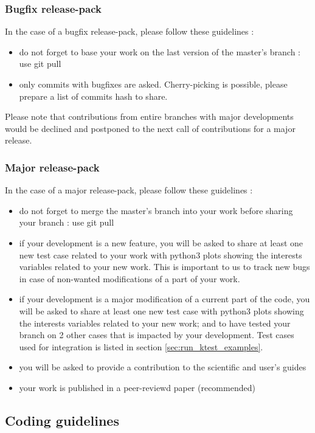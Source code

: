 \subsubsection{Bugfix release-pack}
In the case of a bugfix release-pack, please follow these guidelines :
\begin{itemize}
    \item do not forget to base your work on the last version of the master's branch : use git pull
    \item only commits with bugfixes are asked. Cherry-picking is possible, please prepare a list of commits hash to share.
\end{itemize}
Please note that contributions from entire branches with major developments would be declined and postponed to the next call of contributions for a major release. \\

\subsubsection{Major release-pack}

In the case of a major release-pack, please follow these guidelines :
\begin{itemize}
 \item do not forget to merge the master's branch into your work before sharing your branch : use git pull

 \item if your development is a new feature, you will be asked to share at least one new test case related to your work with python3 plots showing the interests variables related to your new work. This is important to us to track new bugs in case of non-wanted modifications of a part of your work. 
 \item if your development is a major modification of a current part of the code, you will be asked to share at least one new test case with python3 plots showing the interests variables related to your new work; and to have tested your branch on 2 other cases that is impacted by your development. Test cases used for integration is listed in section \ref{sec:run_ktest_examples}. 
 \item you will be asked to provide a contribution to the scientific and user's guides 
 \item your work is published in a peer-reviewd paper (recommended)    
\end{itemize}

\subsection{Coding guidelines}

